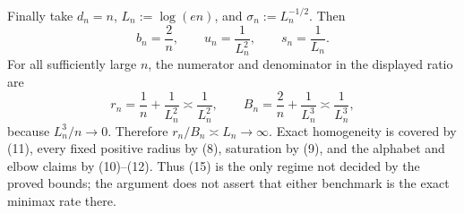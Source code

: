 Finally take \(d_n=n\), \(L_n:=\log(en)\), and \(\sigma_n:=L_n^{-1/2}\).  Then
\[
 b_n=\frac2n,\qquad u_n=\frac1{L_n^2},
 \qquad s_n=\frac1{L_n}.
\tag{17}
\]
For all sufficiently large \(n\), the numerator and denominator in the displayed ratio are
\[
 r_n=\frac1n+\frac1{L_n^2}\asymp\frac1{L_n^2},
 \qquad
 B_n=\frac2n+\frac1{L_n^3}\asymp\frac1{L_n^3},
\tag{18}
\]
because \(L_n^3/n\to0\).  Therefore \(r_n/B_n\asymp L_n\to\infty\).  Exact homogeneity is covered by (11), every fixed positive radius by (8), saturation by (9), and the alphabet and elbow claims by (10)--(12).  Thus (15) is the only regime not decided by the proved bounds; the argument does not assert that either benchmark is the exact minimax rate there.